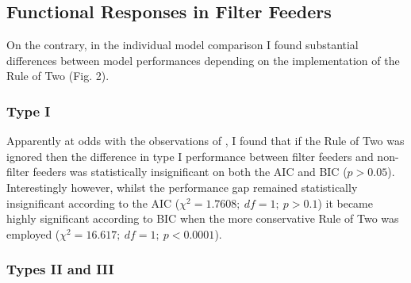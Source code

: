 \documentclass[11pt]{article}
\begin{document}
    
    \subsection{Functional Responses in Filter Feeders}
    
    On the contrary, in the individual model comparison I found substantial differences between model performances depending on the implementation of the Rule of Two (Fig. 2).
    
    \subsubsection{Type I}
    
    Apparently at odds with the observations of \citet{jeschke2004consumer}, I found that if the Rule of Two was ignored then the difference in type I performance between filter feeders and non-filter feeders was statistically insignificant on both the AIC and BIC ($p>0.05$). Interestingly however, whilst the performance gap remained statistically insignificant according to the AIC ($\chi^2=1.7608;\:df=1;\:p>0.1$) it became highly significant according to BIC when the more conservative Rule of Two was employed ($\chi^2=16.617;\:df=1;\:p<0.0001$).
    
    \subsubsection{Types II and III}
    
\end{document}
